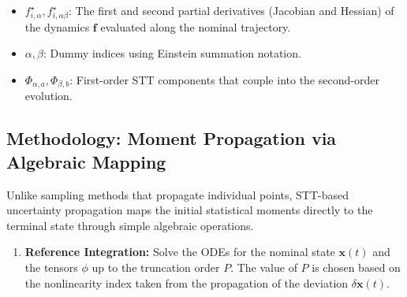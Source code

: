 \documentclass[
  letterpaper,
  DIV=11,
  numbers=noendperiod,
  oneside]{scrartcl}
\providecommand{\tightlist}{%
  \setlength{\itemsep}{0pt}\setlength{\parskip}{0pt}}
\begin{document}
\begin{itemize}
\item
  \(f_{i,\alpha}^\star, f_{i,\alpha\beta}^\star\): The first and second
  partial derivatives (Jacobian and Hessian) of the dynamics
  \(\mathbf{f}\) evaluated along the nominal trajectory.
\item
  \(\alpha, \beta\): Dummy indices using Einstein summation notation.
\item
  \(\Phi_{\alpha,a}, \Phi_{\beta,b}\): First-order STT components that
  couple into the second-order evolution.
\end{itemize}

\subsection{Methodology: Moment Propagation via Algebraic
Mapping}\label{methodology-moment-propagation-via-algebraic-mapping}

Unlike sampling methods that propagate individual points, STT-based
uncertainty propagation maps the initial statistical moments directly to
the terminal state through simple algebraic operations.

\begin{enumerate}
\def\labelenumi{\arabic{enumi}.}
\tightlist
\item
  \textbf{Reference Integration:} Solve the ODEs for the nominal state
  \(\mathbf{x}(t)\) and the tensors \(\phi\) up to the truncation order
  \(P\). The value of \(P\) is chosen based on the nonlinearity index
  taken from the propagation of the deviation \(\delta \mathbf{x}(t)\).
\end{enumerate}
\end{document}
